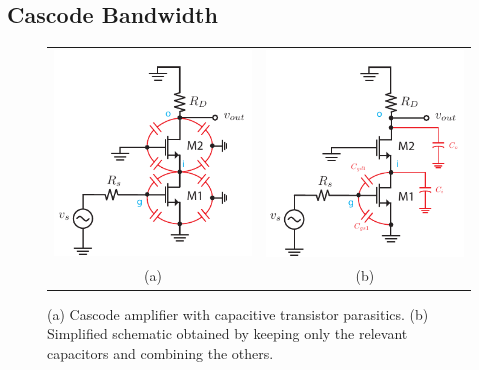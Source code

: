 \subsection{Cascode Bandwidth}
\begin{figure}[tb]
\centering
\begin{tabular}{cc}
\includegraphics[scale=1]{12cascode_caps} &
\includegraphics[scale=1]{13cascode_caps_simple}\\
(a) & (b)\\
\end{tabular}
\caption{(a) Cascode amplifier with capacitive transistor parasitics.  (b) Simplified schematic obtained by keeping only the relevant capacitors and combining the others.}
\label{fig:12cascode_caps}
\end{figure}
